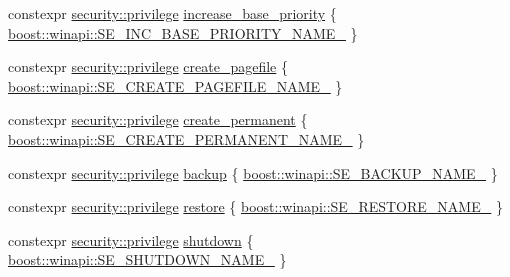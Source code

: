 \begin{DoxyCompactItemize}
\item 
constexpr \mbox{\hyperlink{classdistant_1_1security_1_1privilege}{security\+::privilege}} \mbox{\hyperlink{namespacedistant_1_1security_1_1privileges_aab6e8ad1e8a46014f5818f2212d964ce}{increase\+\_\+base\+\_\+priority}} \{ \mbox{\hyperlink{namespaceboost_1_1winapi_a40a3a4729bfad4ba832415aa3069a289}{boost\+::winapi\+::\+S\+E\+\_\+\+I\+N\+C\+\_\+\+B\+A\+S\+E\+\_\+\+P\+R\+I\+O\+R\+I\+T\+Y\+\_\+\+N\+A\+M\+E\+\_\+}} \}
\item 
constexpr \mbox{\hyperlink{classdistant_1_1security_1_1privilege}{security\+::privilege}} \mbox{\hyperlink{namespacedistant_1_1security_1_1privileges_a06edb2ac5f17b6c170c81374158e1823}{create\+\_\+pagefile}} \{ \mbox{\hyperlink{namespaceboost_1_1winapi_a65259dea10019634b8b40eac75f153ee}{boost\+::winapi\+::\+S\+E\+\_\+\+C\+R\+E\+A\+T\+E\+\_\+\+P\+A\+G\+E\+F\+I\+L\+E\+\_\+\+N\+A\+M\+E\+\_\+}} \}
\item 
constexpr \mbox{\hyperlink{classdistant_1_1security_1_1privilege}{security\+::privilege}} \mbox{\hyperlink{namespacedistant_1_1security_1_1privileges_a14bba76f3b21afc3b5b7c9796ece4a3a}{create\+\_\+permanent}} \{ \mbox{\hyperlink{namespaceboost_1_1winapi_aa60957df0d83a2b41e92c08afd153005}{boost\+::winapi\+::\+S\+E\+\_\+\+C\+R\+E\+A\+T\+E\+\_\+\+P\+E\+R\+M\+A\+N\+E\+N\+T\+\_\+\+N\+A\+M\+E\+\_\+}} \}
\item 
constexpr \mbox{\hyperlink{classdistant_1_1security_1_1privilege}{security\+::privilege}} \mbox{\hyperlink{namespacedistant_1_1security_1_1privileges_a1e9b69ee700d417418934369f501db01}{backup}} \{ \mbox{\hyperlink{namespaceboost_1_1winapi_aeef12453f5b08b1b0796a2d201e25db6}{boost\+::winapi\+::\+S\+E\+\_\+\+B\+A\+C\+K\+U\+P\+\_\+\+N\+A\+M\+E\+\_\+}} \}
\item 
constexpr \mbox{\hyperlink{classdistant_1_1security_1_1privilege}{security\+::privilege}} \mbox{\hyperlink{namespacedistant_1_1security_1_1privileges_a1425c0bf5619f55d95d7b126d114dddf}{restore}} \{ \mbox{\hyperlink{namespaceboost_1_1winapi_a3839ae610aa2b16db98e14cfd1255bae}{boost\+::winapi\+::\+S\+E\+\_\+\+R\+E\+S\+T\+O\+R\+E\+\_\+\+N\+A\+M\+E\+\_\+}} \}
\item 
constexpr \mbox{\hyperlink{classdistant_1_1security_1_1privilege}{security\+::privilege}} \mbox{\hyperlink{namespacedistant_1_1security_1_1privileges_a26b2b2d7c747fd0792ed83d04c38cb68}{shutdown}} \{ \mbox{\hyperlink{namespaceboost_1_1winapi_aff9da0a1831bc20a284b22f39f42a70f}{boost\+::winapi\+::\+S\+E\+\_\+\+S\+H\+U\+T\+D\+O\+W\+N\+\_\+\+N\+A\+M\+E\+\_\+}} \}
\item 

\end{DoxyCompactItemize}
